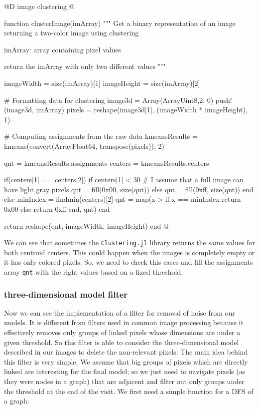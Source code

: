 \documentclass[11pt,oneside]{article}	%
\begin{document}
@D image clustering
@{function clusterImage(imArray)
  """
  Get a binary representation of an image returning
  a two-color image using clustering
  
  imArray: array containing pixel values
  
  return the imArray with only two different values
  """
  
  imageWidth = size(imArray)[1]
  imageHeight = size(imArray)[2]

  # Formatting data for clustering
  image3d = Array(Array{Uint8,2}, 0)
  push!(image3d, imArray)
  pixels = reshape(image3d[1], (imageWidth * imageHeight), 1)
  
  # Computing assignments from the raw data
  kmeansResults = kmeans(convert(Array{Float64}, transpose(pixels)), 2)
  
  qnt = kmeansResults.assignments
  centers = kmeansResults.centers
  
  if(centers[1] == centers[2])
    if centers[1] < 30 # I assume that a full image can have light gray pixels
      qnt = fill(0x00, size(qnt))
    else
      qnt = fill(0xff, size(qnt))
    end
  else
    minIndex = findmin(centers)[2]
    qnt = map(x-> if x == minIndex return 0x00 else return 0xff end, qnt)
  end
  
  return reshape(qnt, imageWidth, imageHeight)  
end @}

We can see that sometimes the \texttt{Clustering.jl} library returns the same values for both centroid centers. This could happen when the images is completely empty or it has only colored pixels. So, we need to check this cases and fill the assignments array \texttt{qnt} with the right values based on a fixed threshold.

\subsubsection{three-dimensional model filter}\label{sec:3dfilter}

Now we can see the implementation of a filter for removal of noise from our models.
It is different from filters used in common image processing because it effectively removes only groups of linked pixels whose dimensions are under a given threshold. So this filter is able to consider the three-dimensional model described in our images to delete the non-relevant pixels.
The main idea behind this filter is very simple. We assume that big groups of pixels which are directly linked are interesting for the final model; so we just need to navigate pixels (as they were nodes in a graph) that are adjacent and filter out only groups under the threshold at the end of the visit. We first need a simple function for a DFS of a graph:
\end{document}
